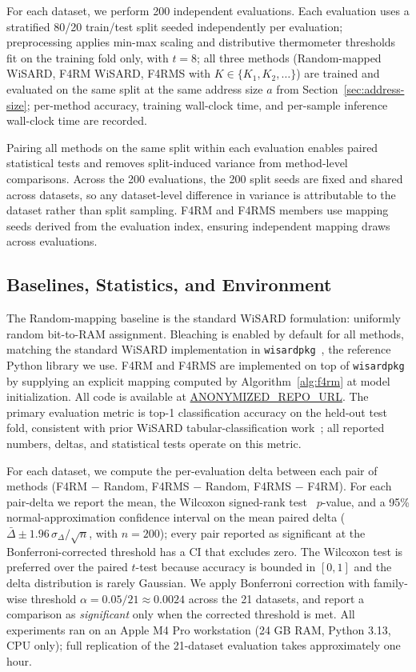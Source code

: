 \documentclass[runningheads]{llncs}
\begin{document}
For each dataset, we perform 200 independent evaluations. Each evaluation uses a stratified 80/20 train/test split seeded independently per evaluation; preprocessing applies min-max scaling and distributive thermometer thresholds~\cite{lima2020distributive} fit on the training fold only, with $t = 8$; all three methods (Random-mapped WiSARD, F4RM WiSARD, F4RMS with $K \in \{K_1, K_2, \ldots\}$) are trained and evaluated on the same split at the same address size $a$ from Section~\ref{sec:address-size}; per-method accuracy, training wall-clock time, and per-sample inference wall-clock time are recorded.

Pairing all methods on the same split within each evaluation enables paired statistical tests and removes split-induced variance from method-level comparisons. Across the 200 evaluations, the 200 split seeds are fixed and shared across datasets, so any dataset-level difference in variance is attributable to the dataset rather than split sampling. F4RM and F4RMS members use mapping seeds derived from the evaluation index, ensuring independent mapping draws across evaluations.

\subsection{Baselines, Statistics, and Environment}
\label{sec:baselines-stats}

The Random-mapping baseline is the standard WiSARD formulation: uniformly random bit-to-RAM assignment. Bleaching is enabled by default for all methods, matching the standard WiSARD implementation in \texttt{wisardpkg}~\cite{wisardpkg}, the reference Python library we use. F4RM and F4RMS are implemented on top of \texttt{wisardpkg} by supplying an explicit mapping computed by Algorithm~\ref{alg:f4rm} at model initialization. All code is available at \url{ANONYMIZED_REPO_URL}. The primary evaluation metric is top-1 classification accuracy on the held-out test fold, consistent with prior WiSARD tabular-classification work~\cite{susskind2022bthowen,susskind2023uleen}; all reported numbers, deltas, and statistical tests operate on this metric.

For each dataset, we compute the per-evaluation delta between each pair of methods (F4RM $-$ Random, F4RMS $-$ Random, F4RMS $-$ F4RM). For each pair-delta we report the mean, the Wilcoxon signed-rank test~\cite{wilcoxon1945individual} $p$-value, and a 95\% normal-approximation confidence interval on the mean paired delta ($\bar{\Delta} \pm 1.96\,\sigma_{\Delta}/\sqrt{n}$, with $n = 200$); every pair reported as significant at the Bonferroni-corrected threshold has a CI that excludes zero. The Wilcoxon test is preferred over the paired $t$-test because accuracy is bounded in $[0,1]$ and the delta distribution is rarely Gaussian. We apply Bonferroni correction with family-wise threshold $\alpha = 0.05 / 21 \approx 0.0024$ across the 21 datasets, and report a comparison as \emph{significant} only when the corrected threshold is met. All experiments ran on an Apple M4 Pro workstation (24 GB RAM, Python 3.13, CPU only); full replication of the 21-dataset evaluation takes approximately one hour.
\end{document}
